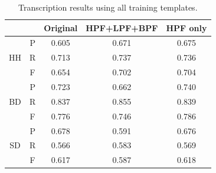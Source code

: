 \documentclass{article}
\begin{document}
\begin{table}[h]
\begin{center}
\begin{tabular}{|c|c|c|c|c|}
\hline
\multicolumn{2}{|c|}{}  & Original & HPF+LPF+BPF & HPF only \\ \hline
\multirow{3}{*}{HH} & P & 0.605    & 0.671       & 0.675    \\ \cline{2-5} 
                    & R & 0.713    & 0.737       & 0.736    \\ \cline{2-5} 
                    & F & 0.654    & 0.702       & 0.704    \\ \hline
\multirow{3}{*}{BD} & P & 0.723    & 0.662       & 0.740    \\ \cline{2-5} 
                    & R & 0.837    & 0.855       & 0.839    \\ \cline{2-5} 
                    & F & 0.776    & 0.746       & 0.786    \\ \hline
\multirow{3}{*}{SD} & P & 0.678    & 0.591       & 0.676    \\ \cline{2-5} 
                    & R & 0.566    & 0.583       & 0.569    \\ \cline{2-5} 
                    & F & 0.617    & 0.587       & 0.618    \\ \hline
\end{tabular}
\end{center}
 \caption{Transcription results using all training templates.}
 \label{tab:basic results}
\end{table}
\end{document}
